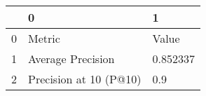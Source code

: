 \begin{tabular}{lll}
\toprule
{} &                       0 &         1 \\
\midrule
0 &                  Metric &     Value \\
1 &       Average Precision &  0.852337 \\
2 &  Precision at 10 (P@10) &       0.9 \\
\bottomrule
\end{tabular}
